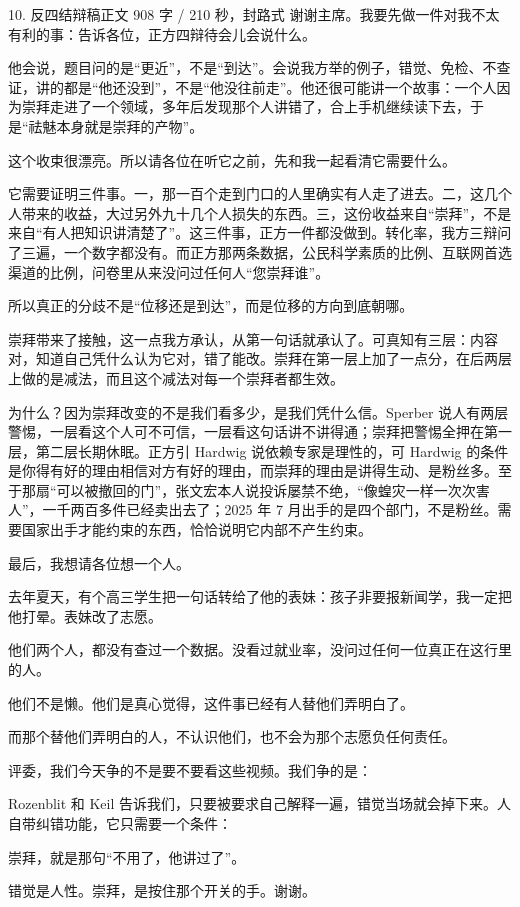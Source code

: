 \documentclass[script,con]{debate}
\begin{document}
\begin{speech}{10. 反四结辩稿}{正文 908 字 / 210 秒，封路式}
谢谢主席。我要先做一件对我不太有利的事：告诉各位，正方四辩待会儿会说什么。

他会说，题目问的是“更近”，不是“到达”。会说我方举的例子，错觉、免检、不查证，讲的都是“他还没到”，不是“他没往前走”。他还很可能讲一个故事：一个人因为崇拜走进了一个领域，多年后发现那个人讲错了，合上手机继续读下去，于是“祛魅本身就是崇拜的产物”。

这个收束很漂亮。所以请各位在听它之前，先和我一起看清它需要什么。

它需要证明三件事。一，那一百个走到门口的人里确实有人走了进去。二，这几个人带来的收益，大过另外九十几个人损失的东西。三，这份收益来自“崇拜”，不是来自“有人把知识讲清楚了”。这三件事，正方一件都没做到。转化率，我方三辩问了三遍，一个数字都没有。而正方那两条数据，公民科学素质的比例、互联网首选渠道的比例，问卷里从来没问过任何人“您崇拜谁”。

所以真正的分歧不是“位移还是到达”，而是位移的方向到底朝哪。

崇拜带来了接触，这一点我方承认，从第一句话就承认了。可真知有三层：内容对，知道自己凭什么认为它对，错了能改。崇拜在第一层上加了一点分，在后两层上做的是减法，而且这个减法对每一个崇拜者都生效。

为什么？因为崇拜改变的不是我们看多少，是我们凭什么信。Sperber 说人有两层警惕，一层看这个人可不可信，一层看这句话讲不讲得通；崇拜把警惕全押在第一层，第二层长期休眠。正方引 Hardwig 说依赖专家是理性的，可 Hardwig 的条件是你得有好的理由相信对方有好的理由，而崇拜的理由是讲得生动、是粉丝多。至于那扇“可以被撤回的门”，张文宏本人说投诉屡禁不绝，“像蝗灾一样一次次害人”，一千两百多件已经卖出去了；2025 年 7 月出手的是四个部门，不是粉丝。需要国家出手才能约束的东西，恰恰说明它内部不产生约束。

最后，我想请各位想一个人。

去年夏天，有个高三学生把一句话转给了他的表妹：孩子非要报新闻学，我一定把他打晕。表妹改了志愿。

他们两个人，都没有查过一个数据。没看过就业率，没问过任何一位真正在这行里的人。

他们不是懒。他们是真心觉得，这件事已经有人替他们弄明白了。

而那个替他们弄明白的人，不认识他们，也不会为那个志愿负任何责任。

评委，我们今天争的不是要不要看这些视频。我们争的是：

Rozenblit 和 Keil 告诉我们，只要被要求自己解释一遍，错觉当场就会掉下来。人自带纠错功能，它只需要一个条件：

崇拜，就是那句“不用了，他讲过了”。

错觉是人性。崇拜，是按住那个开关的手。谢谢。

\begin{contingency}
\end{contingency}
\end{speech}
\end{document}
